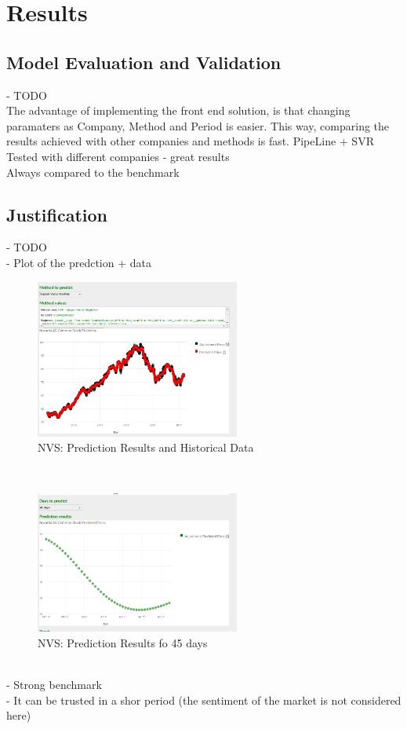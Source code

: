 \section{Results}
\label{sec:results}

\subsection{Model Evaluation and Validation}
- TODO\\


The advantage of implementing the front end solution, is that changing paramaters as Company, Method and Period is easier. This way, comparing the results achieved with other companies and
methods is fast. 
PipeLine + SVR\\
Tested with different companies - great results\\
Always compared to the benchmark\\


\subsection{Justification}
- TODO\\


- Plot of the predction + data\\

\begin{figure}[H]
\centering
\includegraphics[width=0.6\textwidth]{figures/predict_svr.png}
\caption{NVS: Prediction Results and Historical Data}
\label{fig:predict_svr}
\end{figure}
\ \\
\begin{figure}[H]
\centering
\includegraphics[width=0.6\textwidth]{figures/predict_45days.png}
\caption{NVS: Prediction Results fo 45 days}
\label{fig:predict_45days}
\end{figure}
\ \\

- Strong benchmark\\
- It can be trusted in a shor period (the sentiment of the market is not considered here)\\